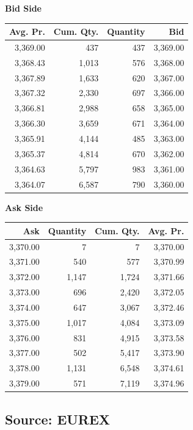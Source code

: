 \medskip

\noindent \begin{minipage}[t]{0.48\textwidth} \centering \textbf{Bid Side}

\smallskip \begin{tabular}{@{} rrrr@{}}
\toprule
Avg. Pr. & Cum. Qty. & Quantity & Bid \\
\midrule
3,369.00 & 437 & 437 & 3,369.00 \\
3,368.43 & 1,013 & 576 & 3,368.00 \\
3,367.89 & 1,633 & 620 & 3,367.00 \\
3,367.32 & 2,330 & 697 & 3,366.00 \\
3,366.81 & 2,988 & 658 & 3,365.00 \\
3,366.30 & 3,659 & 671 & 3,364.00 \\
3,365.91 & 4,144 & 485 & 3,363.00 \\
3,365.37 & 4,814 & 670 & 3,362.00 \\
3,364.63 & 5,797 & 983 & 3,361.00 \\
3,364.07 & 6,587 & 790 & 3,360.00 \\
\bottomrule
\end{tabular}
\end{minipage}\hfill \begin{minipage}[t]{0.48\textwidth} \centering \textbf{Ask Side}

\smallskip \begin{tabular}{@{} rrrr@{}}
\toprule
Ask & Quantity & Cum. Qty. & Avg. Pr. \\
\midrule
3,370.00 & 7 & 7 & 3,370.00 \\
3,371.00 & 540 & 577 & 3,370.99 \\
3,372.00 & 1,147 & 1,724 & 3,371.66 \\
3,373.00 & 696 & 2,420 & 3,372.05 \\
3,374.00 & 647 & 3,067 & 3,372.46 \\
3,375.00 & 1,017 & 4,084 & 3,373.09 \\
3,376.00 & 831 & 4,915 & 3,373.58 \\
3,377.00 & 502 & 5,417 & 3,373.90 \\
3,378.00 & 1,131 & 6,548 & 3,374.61 \\
3,379.00 & 571 & 7,119 & 3,374.96 \\
\bottomrule
\end{tabular}
\end{minipage}
\endgroup

\subsection*{Source: EUREX}

